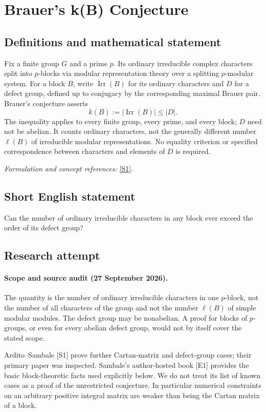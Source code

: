 \documentclass[11pt]{article}
\begin{document}
\section*{\texorpdfstring{Brauer's k(B) Conjecture}{Brauer's k(B) Conjecture}}\label{352}
\subsection{Definitions and mathematical statement}
Fix a finite group $G$ and a prime $p$. Its ordinary irreducible complex characters split into $p$-blocks via modular representation theory over a splitting $p$-modular system. For a block $B$, write $\operatorname{Irr}(B)$ for its ordinary characters and $D$ for a defect group, defined up to conjugacy by the corresponding maximal Brauer pair. Brauer's conjecture asserts
\[
 k(B):=|\operatorname{Irr}(B)|\le |D|.
\]
The inequality applies to every finite group, every prime, and every block; $D$ need not be abelian. It counts ordinary characters, not the generally different number $\ell(B)$ of irreducible modular representations. No equality criterion or specified correspondence between characters and elements of $D$ is required.
\par\smallskip\textit{Formulation and concept references:} \href{https://arxiv.org/pdf/1911.10710}{[S1]}.

\subsection{Short English statement}
Can the number of ordinary irreducible characters in any block ever exceed the order of its defect group?
\subsection{Research attempt}
\paragraph{Scope and source audit (27 September 2026).}
The quantity is the number of ordinary irreducible characters in one
$p$-block, not the number of all characters of the group and not the
number $\ell(B)$ of simple modular modules. The defect group may be
nonabelian. A proof for blocks of $p$-groups, or even for every abelian
defect group, would not by itself cover the stated scope.

Ardito--Sambale [S1] prove further Cartan-matrix and defect-group cases;
their primary paper was inspected. Sambale's author-hosted book [E1]
provides the basic block-theoretic facts used explicitly below. We do
not treat its list of known cases as a proof of the unrestricted
conjecture. In particular numerical constraints on an arbitrary positive
integral matrix are weaker than being the Cartan matrix of a block.
\end{document}
